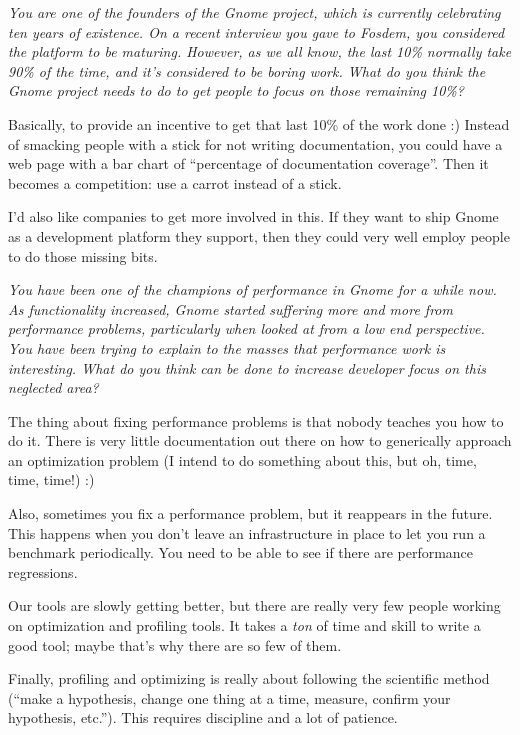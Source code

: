 \documentclass{book}
\begin{document}
\bigskip

\emph{You are one of the founders of the Gnome project, which is
  currently celebrating ten years of existence. On a recent interview
  you gave to Fosdem, you considered the platform to be
  maturing. However, as we all know, the last 10\% normally take 90\%
  of the time, and it's considered to be boring work. What do you
  think the Gnome project needs to do to get people to focus on those
  remaining 10\%?}

\bigskip

Basically, to provide an incentive to get that last 10\% of the work
done :) Instead of smacking people with a stick for not writing
documentation, you could have a web page with a bar chart of
``percentage of documentation coverage''. Then it becomes a competition:
use a carrot instead of a stick.

I'd also like companies to get more involved in this. If they want to
ship Gnome as a development platform they support, then they could
very well employ people to do those missing bits.

\bigskip

\emph{You have been one of the champions of performance in Gnome for a
while now. As functionality increased, Gnome started suffering more
and more from performance problems, particularly when looked at from a
low end perspective. You have been trying to explain to the masses
that performance work is interesting. What do you think can be done to
increase developer focus on this neglected area?}

\bigskip

The thing about fixing performance problems is that nobody teaches you
how to do it. There is very little documentation out there on how to
generically approach an optimization problem (I intend to do something
about this, but oh, time, time, time!) :)

Also, sometimes you fix a performance problem, but it reappears in the
future. This happens when you don't leave an infrastructure in place
to let you run a benchmark periodically. You need to be able to see if
there are performance regressions.

Our tools are slowly getting better, but there are really very few
people working on optimization and profiling tools. It takes a
\emph{ton} of time and skill to write a good tool; maybe that's why
there are so few of them.

Finally, profiling and optimizing is really about following the
scientific method (``make a hypothesis, change one thing at a time,
measure, confirm your hypothesis, etc.''). This requires discipline and
a lot of patience.
\end{document}
